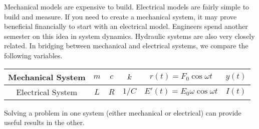 Mechanical models are expensive to build.  Electrical models are fairly simple to build and measure.  If you need to create a mechanical system, it may prove beneficial financially to start with an electrical model. Engineers spend another semester on this idea in system dynamics.  Hydraulic systems are also very closely related. In bridging between mechanical and electrical systems, we compare the following variables. 

\begin{center}
\begin{tabular}{|c|c|c|c|c|c|}
\hline
Mechanical System&$m$&$c$&$k$&$r(t)=F_0\cos\omega t$&$y(t)$\\\hline
Electrical System&$L$&$R$&$1/C$&$E'(t) = E_0\omega\cos\omega t$&$I(t)$\\
\hline
\end{tabular}
\end{center}

Solving a problem in one system (either mechanical or electrical) can provide useful results in the other.  

